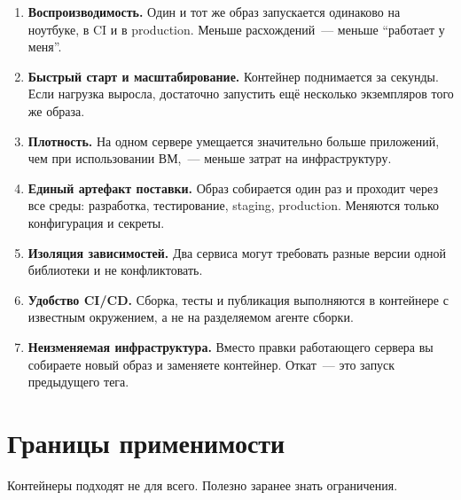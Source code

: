 \begin{enumerate}
  \item \textbf{Воспроизводимость.} Один и тот же образ запускается
        одинаково на ноутбуке, в CI и в production. Меньше расхождений~---
        меньше \enquote{работает у меня}.
  \item \textbf{Быстрый старт и масштабирование.} Контейнер поднимается
        за секунды. Если нагрузка выросла, достаточно запустить ещё
        несколько экземпляров того же образа.
  \item \textbf{Плотность.} На одном сервере умещается значительно больше
        приложений, чем при использовании ВМ,~--- меньше затрат
        на инфраструктуру.
  \item \textbf{Единый артефакт поставки.} Образ собирается один раз
        и проходит через все среды: разработка, тестирование, staging,
        production. Меняются только конфигурация и секреты.
  \item \textbf{Изоляция зависимостей.} Два сервиса могут требовать разные
        версии одной библиотеки и не конфликтовать.
  \item \textbf{Удобство CI/CD.} Сборка, тесты и публикация выполняются
        в контейнере с известным окружением, а не на разделяемом
        агенте сборки.
  \item \textbf{Неизменяемая инфраструктура.} Вместо правки работающего
        сервера вы собираете новый образ и заменяете контейнер.
        Откат~--- это запуск предыдущего тега.
\end{enumerate}

\section{Границы применимости}

Контейнеры подходят не для всего. Полезно заранее знать ограничения.

